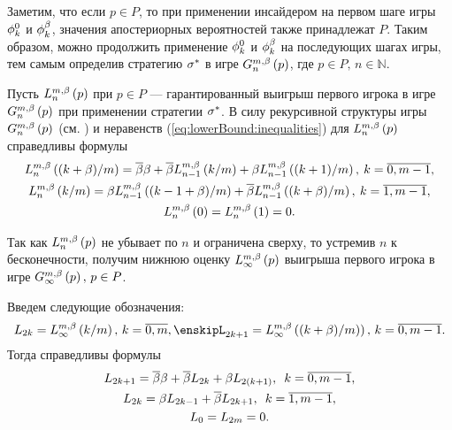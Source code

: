 Заметим, что если $p \in P$, то при применении инсайдером на первом шаге игры
$\fEven$ и $\fOdd$, значения апостериорных вероятностей также принадлежат $P$.
Таким образом, можно продолжить применение $\fEven$ и $\fOdd$ на последующих
шагах игры, тем самым определив стратегию $\fOpt$ в игре $\generalGame{n}{p}$,
где $p \in P, \, n \in \mathbb{N}$.

Пусть $\lowerBound[n]{p}$ при $p \in P$ --- гарантированный выигрыш первого
игрока в игре $\generalGame{n}{p}$ при применении стратегии $\fOpt$. В силу
рекурсивной структуры игры $\generalGame{n}{p}$ (см. \cite{domansky07}) и
неравенств (\ref{eq:lowerBound:inequalities}) для $\lowerBound[n]{p}$
справедливы формулы
\begin{equation}
  \begin{gathered}
    \label{eq:lowerBound:recurrence:function}
    \lowerBound[n]{(k + \Co)/m} = \DCo\Co + \DCo\lowerBound[n-1]{k/m} +
    \Co\lowerBound[n-1]{(k + 1)/m}, \: k = \overline{0, m-1}, \\
    \lowerBound[n]{k/m} = \Co\lowerBound[n-1]{(k - 1 + \Co)/m} +
    \DCo\lowerBound[n-1]{(k + \Co)/m}, \: k = \overline{1, m-1}, \\
    \lowerBound[n]{0} = \lowerBound[n]{1} = 0.
  \end{gathered}
\end{equation}

Так как $\lowerBound[n]{p}$ не убывает по $n$ и ограничена сверху, то устремив
$n$ к бесконечности, получим нижнюю оценку $\lowerBound{p}$ выигрыша первого
игрока в игре $\infiniteGame{p}, \, p \in P$.

Введем следующие обозначения:
\[
  L_{2k} = \lowerBound{k/m}, \, k = \overline{0,m}, \enskip%
  L_{2k+1} = \lowerBound{(k+\Co)/m)}, \, k = \overline{0,m-1}.
\]
Тогда справедливы формулы
\begin{equation}
  \label{eq:lowerRecurrence}
  \begin{gathered}
    L_{2k+1} = \DCo\Co + \DCo L_{2k} + \Co L_{2(k+1)}, \enskip k = \overline{0, m-1},\\
    L_{2k} = \Co L_{2k-1} + \DCo L_{2k+1}, \enskip k = \overline{1, m-1},\\
    L_0 = L_{2m} = 0.
  \end{gathered}
\end{equation}

